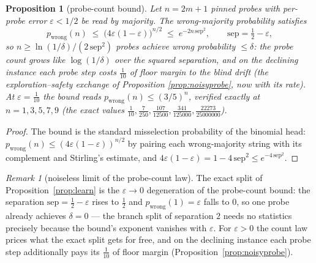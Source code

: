 \documentclass[10pt,twocolumn]{article}
\theoremstyle{plain}
\newtheorem{proposition}[theorem]{Proposition}
\theoremstyle{definition}
\theoremstyle{remark}
\newtheorem{remark}[theorem]{Remark}
\begin{document}
\begin{proposition}[probe-count bound]\label{prop:probecount}
Let \(n = 2m + 1\) pinned probes with per-probe error
\(\varepsilon < 1/2\) be read by majority. The wrong-majority
probability satisfies
\[
p_{\mathrm{wrong}}(n) \;\le\; \bigl(4\varepsilon(1 - \varepsilon)\bigr)^{n/2}
\;\le\; e^{-2 n\, \mathrm{sep}^{2}},
\qquad \mathrm{sep} = \tfrac12 - \varepsilon,
\]
so \(n \ge \ln(1/\delta) / (2\,\mathrm{sep}^{2})\) probes achieve
wrong probability \(\le \delta\): the probe count grows like
\(\log(1/\delta)\) over the squared separation, and on the declining
instance each probe step costs \(\tfrac1{10}\) of floor margin to the
blind drift (the exploration--safety exchange of Proposition
\ref{prop:noisyprobe}, now with its rate). At
\(\varepsilon = \tfrac1{10}\) the bound reads
\(p_{\mathrm{wrong}}(n) \le (3/5)^{n}\), verified exactly at
\(n = 1, 3, 5, 7, 9\) (the exact values \(\tfrac1{10},
\tfrac7{250}, \tfrac{107}{12500}, \tfrac{341}{125000},
\tfrac{22273}{25000000}\)).
\end{proposition}

\begin{proof}
The bound is the standard misselection probability of the binomial
head: \(p_{\mathrm{wrong}}(n) \le (4\varepsilon(1-\varepsilon))^{n/2}\)
by pairing each wrong-majority string with its complement and
Stirling's estimate, and \(4\varepsilon(1 - \varepsilon) =
1 - 4\,\mathrm{sep}^{2} \le e^{-4\,\mathrm{sep}^{2}}\).
\end{proof}

\begin{remark}[noiseless limit of the probe-count law]
\label{rem:eps0}
The exact split of Proposition~\ref{prop:learn} is the
\(\varepsilon \to 0\) degeneration of the probe-count bound: the
separation \(\mathrm{sep} = \tfrac12 - \varepsilon\) rises to
\(\tfrac12\) and \(p_{\mathrm{wrong}}(1) = \varepsilon\) falls to
\(0\), so one probe already achieves \(\delta = 0\) --- the branch
split of separation \(2\) needs no statistics precisely because the
bound's exponent vanishes with \(\varepsilon\). For
\(\varepsilon > 0\) the count law prices what the exact split gets
for free, and on the declining instance each probe step additionally
pays its \(\tfrac1{10}\) of floor margin
(Proposition~\ref{prop:noisyprobe}).
\end{remark}
\end{document}
